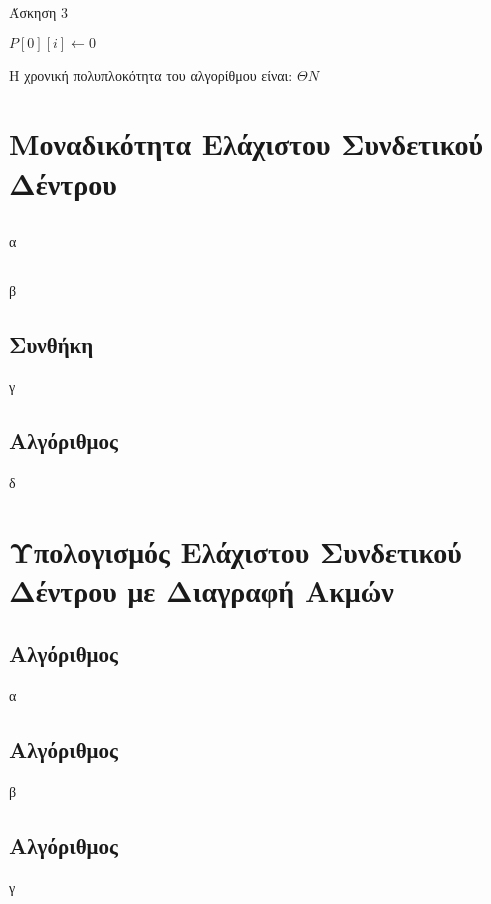\documentclass[a4paper,11pt]{article}
\begin{document}
\begin{algorithm}[H]
\caption{Άσκηση 3}
\begin{algorithmic}[1]
	\State $P[0][i] \gets 0$
\EndProcedure
\end{algorithmic}
\end{algorithm}

Η χρονική πολυπλοκότητα του αλγορίθμου είναι: $\Theta{N}$


\section{Μοναδικότητα Ελάχιστου Συνδετικού Δέντρου}
\subsection{}
α
\subsection{}
β
\subsection{Συνθήκη}
γ
\subsection{Αλγόριθμος}
δ


\section{Υπολογισμός Ελάχιστου Συνδετικού Δέντρου με Διαγραφή Ακμών}
\subsection{Αλγόριθμος}
α
\subsection{Αλγόριθμος}
β
\subsection{Αλγόριθμος}
γ

\end{document}
